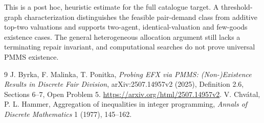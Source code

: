 \documentclass[11pt]{article}
\theoremstyle{definition}
\begin{document}
This is a post hoc, heuristic estimate for the full catalogue target.
A threshold-graph characterization distinguishes the feasible pair-demand class from additive top-two valuations and supports two-agent, identical-valuation and few-goods existence cases. The general heterogeneous allocation argument still lacks a terminating repair invariant, and computational searches do not prove universal PMMS existence.

\begin{thebibliography}{9}
 J. Byrka, F. Malinka, T. Ponitka, \emph{Probing EFX via PMMS: (Non-)Existence Results in Discrete Fair
Division}, arXiv:2507.14957v2 (2025), Definition 2.6, Sections 6--7, Open Problem 5. \url{https://arxiv.org/html/2507.14957v2}.
 V. Chv\'atal, P. L. Hammer, Aggregation of inequalities in integer programming, \emph{Annals of Discrete
Mathematics} 1 (1977), 145--162.
\end{thebibliography}
\end{document}
